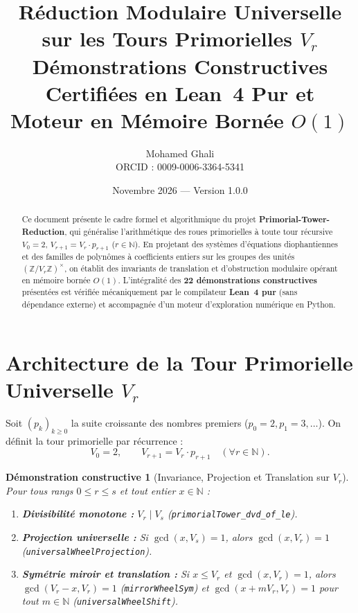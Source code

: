 \documentclass[11pt,a4paper]{article}
\title{\textbf{Réduction Modulaire Universelle sur les Tours Primorielles $V_r$} \\
\large Démonstrations Constructives Certifiées en Lean~4 Pur et Moteur en Mémoire Bornée $O(1)$}
\author{Mohamed Ghali \\ \small ORCID : 0009-0006-3364-5341}
\date{Novembre 2026 — Version 1.0.0}
\newtheorem{demonstration}{Démonstration constructive}
\begin{document}
\maketitle

\begin{abstract}
Ce document présente le cadre formel et algorithmique du projet \textbf{Primorial-Tower-Reduction}, qui généralise l'arithmétique des roues primorielles à toute tour récursive $V_0 = 2$, $V_{r+1} = V_r \cdot p_{r+1}$ ($r \in \mathbb{N}$). En projetant des systèmes d'équations diophantiennes et des familles de polynômes à coefficients entiers sur les groupes des unités $(\mathbb{Z}/V_r\mathbb{Z})^\times$, on établit des invariants de translation et d'obstruction modulaire opérant en mémoire bornée $O(1)$. L'intégralité des \textbf{22 démonstrations constructives} présentées est vérifiée mécaniquement par le compilateur \textbf{Lean~4 pur} (sans dépendance externe) et accompagnée d'un moteur d'exploration numérique en Python.
\end{abstract}

\section{Architecture de la Tour Primorielle Universelle $V_r$}

Soit $(p_k)_{k \ge 0}$ la suite croissante des nombres premiers ($p_0 = 2, p_1 = 3, \dots$). On définit la tour primorielle par récurrence :
\begin{equation}
V_0 = 2, \qquad V_{r+1} = V_r \cdot p_{r+1} \quad (\forall r \in \mathbb{N}).
\end{equation}

\begin{demonstration}[Invariance, Projection et Translation sur $V_r$]
Pour tous rangs $0 \le r \le s$ et tout entier $x \in \mathbb{N}$ :
\begin{enumerate}
    \item \textbf{Divisibilité monotone :} $V_r \mid V_s$ (\texttt{primorialTower\_dvd\_of\_le}).
    \item \textbf{Projection universelle :} Si $\gcd(x, V_s) = 1$, alors $\gcd(x, V_r) = 1$ (\texttt{universalWheelProjection}).
    \item \textbf{Symétrie miroir et translation :} Si $x \le V_r$ et $\gcd(x, V_r) = 1$, alors $\gcd(V_r - x, V_r) = 1$ (\texttt{mirrorWheelSym}) et $\gcd(x + m V_r, V_r) = 1$ pour tout $m \in \mathbb{N}$ (\texttt{universalWheelShift}).
\end{enumerate}
\end{demonstration}
\end{document}
